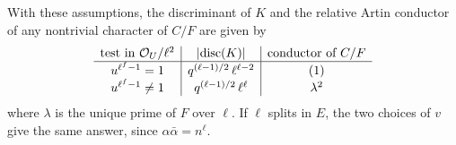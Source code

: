 \begin{theorem}\label{dir:thm:localtest}
With these assumptions, the discriminant of $K$ and the relative Artin conductor of
any nontrivial character of $C/F$ are given by
\[
 \begin{array}{c|c|c}
 \text{test in }\mathcal{O}_U/\ell^2 & \lvert\operatorname{disc}(K)\rvert & \text{conductor of }C/F\\ \hline
 u^{\ell^f-1}=1 & q^{(\ell-1)/2}\,\ell^{\ell-2} & (1)\\
 u^{\ell^f-1}\ne1 & q^{(\ell-1)/2}\,\ell^{\ell} & \lambda^2
 \end{array}
\]
where $\lambda$ is the unique prime of $F$ over $\ell$. If $\ell$ splits in $E$, the
two choices of $v$ give the same answer, since $\alpha\bar\alpha=n^\ell$.
\end{theorem}

